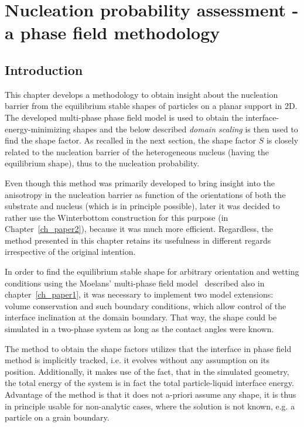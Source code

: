 \chapter{Nucleation probability assessment - a phase field methodology}\label{ch_NPA_PF_methodology}

\section{Introduction}
This chapter develops a methodology to obtain insight about the nucleation barrier from the equilibrium stable shapes of particles on a planar support in 2D. The developed multi-phase phase field model is used to obtain the interface-energy-minimizing shapes and the below described \textit{domain scaling} is then used to find the shape factor. As recalled in the next section, the shape factor $S$ is closely related to the nucleation barrier of the heterogeneous nucleus (having the equilibrium shape), thus to the nucleation probability. 

Even though this method was primarily developed to bring insight into the anisotropy in the nucleation barrier as function of the orientations of both the substrate and nucleus (which is in principle possible), later it was decided to rather use the Winterbottom construction for this purpose (in Chapter~\ref{ch_paper2}), because it was much more efficient. Regardless, the method presented in this chapter retains its usefulness in different regards irrespective of the original intention. 

In order to find the equilibrium stable shape for arbitrary orientation and wetting conditions using the Moelans' multi-phase field model~\cite{Moelans2008} described also in chapter~\ref{ch_paper1}, it was necessary to implement two model extensions: volume conservation and such boundary conditions, which allow control of the interface inclination at the domain boundary. That way, the shape could be simulated in a two-phase system as long as the contact angles were known.


The method to obtain the shape factors utilizes that the interface in phase field method is implicitly tracked, i.e. it evolves without any assumption on its position. Additionally, it makes use of the fact, that in the simulated geometry, the total energy of the system is in fact the total particle-liquid interface energy. Advantage of the method is that it does not a-priori assume any shape, it is thus in principle usable for non-analytic cases, where the solution is not known, e.g. a particle on a grain boundary.

